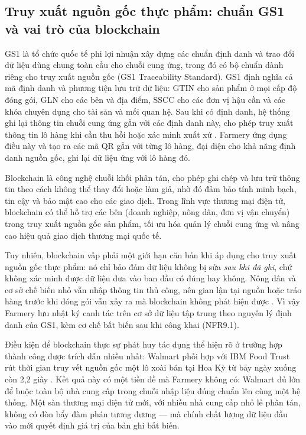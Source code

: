 \subsection{Truy xuất nguồn gốc thực phẩm: chuẩn GS1 và vai trò của blockchain}
\label{subsec:gs1blockchain}

GS1 là tổ chức quốc tế phi lợi nhuận xây dựng các chuẩn định danh và trao đổi dữ liệu dùng chung toàn cầu cho chuỗi cung ứng, trong đó có bộ chuẩn dành riêng cho truy xuất nguồn gốc (GS1 Traceability Standard). GS1 định nghĩa cả mã định danh và phương tiện lưu trữ dữ liệu: GTIN cho sản phẩm ở mọi cấp độ đóng gói, GLN cho các bên và địa điểm, SSCC cho các đơn vị hậu cần và các khóa chuyên dụng cho tài sản và mối quan hệ. Sau khi có định danh, hệ thống ghi lại thông tin chuỗi cung ứng gắn với các định danh này, cho phép truy xuất thông tin lô hàng khi cần thu hồi hoặc xác minh xuất xứ \parencite{gs1_keys}. Farmery ứng dụng điều này và tạo ra các mã QR gắn với từng lô hàng, đại diện cho khả năng định danh nguồn gốc, ghi lại dữ liệu ứng với lô hàng đó.

Blockchain là công nghệ chuỗi khối phân tán, cho phép ghi chép và lưu trữ thông tin theo cách không thể thay đổi hoặc làm giả, nhờ đó đảm bảo tính minh bạch, tin cậy và bảo mật cao cho các giao dịch. Trong lĩnh vực thương mại điện tử, blockchain có thể hỗ trợ các bên (doanh nghiệp, nông dân, đơn vị vận chuyển) trong truy xuất nguồn gốc sản phẩm, tối ưu hóa quản lý chuỗi cung ứng và nâng cao hiệu quả giao dịch thương mại quốc tế.

Tuy nhiên, blockchain vấp phải một giới hạn căn bản khi áp dụng cho truy xuất nguồn gốc thực phẩm: nó chỉ bảo đảm dữ liệu không bị sửa \emph{sau khi đã ghi}, chứ không xác minh được dữ liệu đưa vào ban đầu có đúng hay không. Nông dân và cơ sở chế biến nhỏ vẫn nhập thông tin thủ công, nên gian lận tại nguồn hoặc tráo hàng trước khi đóng gói vẫn xảy ra mà blockchain không phát hiện được \parencite{bath_blockchain}. Vì vậy Farmery lưu nhật ký canh tác trên cơ sở dữ liệu tập trung theo nguyên lý định danh của GS1, kèm cơ chế bất biến sau khi công khai (NFR9.1).

Điều kiện để blockchain thực sự phát huy tác dụng thể hiện rõ ở trường hợp thành công được trích dẫn nhiều nhất: Walmart phối hợp với IBM Food Trust rút thời gian truy vết nguồn gốc một lô xoài bán tại Hoa Kỳ từ bảy ngày xuống còn 2,2 giây \parencite{walmart_ibm_foodtrust}. Kết quả này có một tiền đề mà Farmery không có: Walmart đủ lớn để buộc toàn bộ nhà cung cấp trong chuỗi nhập liệu đúng chuẩn lên cùng một hệ thống. Một sàn thương mại điện tử mới, với nhiều nhà cung cấp nhỏ lẻ phân tán, không có đòn bẩy đàm phán tương đương --- mà chính chất lượng dữ liệu đầu vào mới quyết định giá trị của bản ghi bất biến.

